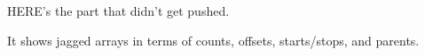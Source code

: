 \documentclass[aspectratio=169]{beamer}
\begin{document}












\begin{frame}{}
\LARGE
\vspace{1 cm}
HERE's the part that didn't get pushed.

\vspace{1 cm}
It shows jagged arrays in terms of counts, offsets, starts/stops, and parents.
\end{frame}
\end{document}
